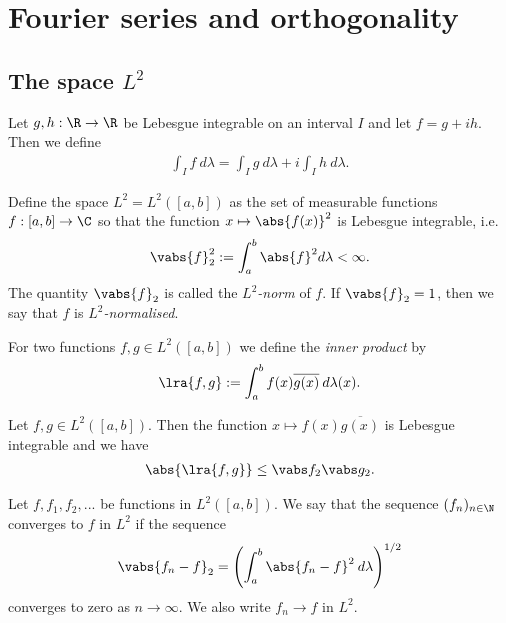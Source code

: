 \documentclass{article}
\begin{document}
\section{Fourier series and orthogonality}

\subsection{The space $L^2$}

\begin{definition}
	Let $g,h:\R\to\R$ be Lebesgue integrable on an interval $I$ and let $f=g+ih$. Then we
	define
	\begin{align*}
		\int_I	f\:d\lambda = \int_I g\:d\lambda + i\int_I h\:d\lambda.
	\end{align*}
\end{definition}

\begin{definition}
	Define the space $L^2=L^2([a,b])$ as the set of measurable functions $f:[a,b]\to\C$
	so that the function $x\mapsto \abs{f(x)}^2$ is Lebesgue integrable, i.e.
	\begin{align*}
		\vabs{f}_2^2 := \int_a^b \abs{f}^2 d\lambda < \infty.
	\end{align*}
	The quantity $\vabs{f}_2$ is called the \emph{$L^2$-norm} of $f$. If $\vabs{f}_2=1$,
	then we say that $f$ is \emph{$L^2$-normalised}.
\end{definition}

\begin{definition}
	For two functions $f,g\in L^2([a,b])$ we define the \emph{inner product} by
	\begin{align*}
		\lra{f,g} := \int_a^b f(x)\overline{g(x)}\:d\lambda(x).
	\end{align*}
\end{definition}

\begin{theorem}
	Let $f,g\in L^2([a,b])$. Then the function $x\mapsto f(x)\overline{g(x)}$ is Lebesgue
	integrable and we have
	\begin{align*}
		\abs{\lra{f,g}}\leq \vabs f_2\vabs g_2.
	\end{align*}
\end{theorem}

\begin{definition}
	Let $f,f_1,f_2,...$ be functions in $L^2([a,b])$. We say that the sequence $(f_n)_{n\in\N}$ converges
	to $f$ in $L^2$ if the sequence
	\begin{align*}
		\vabs{f_n - f}_2 = \left(\int_a^b \abs{f_n-f}^2\:d\lambda\right)^{1/2}
	\end{align*}
	converges to zero as $n\to\infty$. We also write $f_n\to f$ in $L^2$.
\end{definition}
\end{document}
